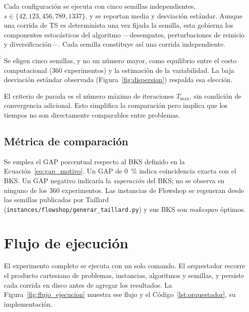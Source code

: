 Cada configuración se ejecuta con cinco semillas independientes,
$s \in \{42, 123, 456, 789, 1337\}$, y se reportan media y desviación
estándar. Aunque una corrida de TS es determinista una vez fijada la semilla,
esta gobierna los componentes estocásticos del algoritmo —desempates,
perturbaciones de reinicio y diversificación—. Cada semilla constituye así una corrida independiente.

Se eligen cinco semillas, y no un número mayor, como equilibrio entre el
costo computacional (360 experimentos) y la estimación de la variabilidad.
La baja desviación estándar observada (Figura~\ref{fig:dispersion}) respalda
esa elección.

El criterio de parada es el número máximo de iteraciones $T_{\max}$, sin
condición de convergencia adicional. Esto simplifica la comparación pero
implica que los tiempos no son directamente comparables entre problemas.

\subsection{Métrica de comparación}

Se emplea el GAP porcentual respecto al BKS definido en la
Ecuación~\ref{eq:gap_motivo}. Un GAP de \SI{0}{\percent} indica coincidencia exacta con el BKS. Un GAP negativo indicaría la \emph{superación} del BKS; no se observa en ninguno de los 360 experimentos. Las instancias de Flowshop se regeneran
desde las semillas publicadas por Taillard~\cite{taillard1993benchmarks}
(\texttt{instances/flowshop/generar\_taillard.py}) y sus BKS son
\emph{makespan} óptimos.

\section{Flujo de ejecución}

El experimento completo se ejecuta con un solo comando. El orquestador
recorre el producto cartesiano de problemas, instancias, algoritmos y
semillas, y persiste cada corrida en disco antes de agregar los resultados.
La Figura~\ref{fig:flujo_ejecucion} muestra ese flujo y el
Código~\ref{lst:orquestador}, su implementación.


